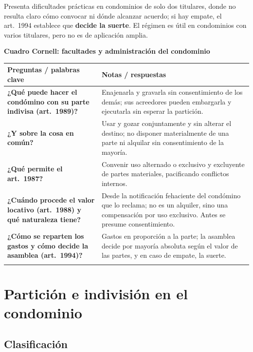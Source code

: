 \documentclass[12pt,oneside]{book}
\renewcommand{\arraystretch}{1.25}
\newcommand{\cq}[2]{\textbf{#1} & #2 \\[0.45em]}
\newcommand{\cornell}[3]{%
\par\bigskip\noindent\textbf{\large Cuadro Cornell: #1}\par\smallskip
\begin{center}
\small
\renewcommand{\arraystretch}{1.15}
\begin{tabularx}{\textwidth}{>{\raggedright\arraybackslash}p{0.27\textwidth}>{\raggedright\arraybackslash}X}
\toprule
\textbf{Preguntas / palabras clave} & \textbf{Notas / respuestas} \\
\midrule
#2
\midrule
\multicolumn{2}{p{\dimexpr\textwidth-2\tabcolsep\relax}}{\textbf{Resumen.} #3} \\
\bottomrule
\end{tabularx}
\end{center}
}
\begin{document}
Presenta dificultades prácticas en condominios de solo dos titulares, donde no resulta claro cómo convocar ni dónde alcanzar acuerdo; si hay empate, el art.~1994 establece que \textbf{decide la suerte}. El régimen es útil en condominios con varios titulares, pero no es de aplicación amplia.

\cornell{facultades y administración del condominio}{
\cq{¿Qué puede hacer el condómino con su parte indivisa (art.~1989)?}{Enajenarla y gravarla sin consentimiento de los demás; sus acreedores pueden embargarla y ejecutarla sin esperar la partición.}
\cq{¿Y sobre la cosa en común?}{Usar y gozar conjuntamente y sin alterar el destino; no disponer materialmente de una parte ni alquilar sin consentimiento de la mayoría.}
\cq{¿Qué permite el art.~1987?}{Convenir uso alternado o exclusivo y excluyente de partes materiales, pacificando conflictos internos.}
\cq{¿Cuándo procede el valor locativo (art.~1988) y qué naturaleza tiene?}{Desde la notificación fehaciente del condómino que lo reclama; no es un alquiler, sino una compensación por uso exclusivo. Antes se presume consentimiento.}
\cq{¿Cómo se reparten los gastos y cómo decide la asamblea (art.~1994)?}{Gastos en proporción a la parte; la asamblea decide por mayoría absoluta según el valor de las partes, y en caso de empate, la suerte.}
}{Las facultades del condómino son amplísimas sobre su parte indivisa y restringidas sobre la cosa común. El uso y goce puede pactarse; el uso exclusivo no pactado da lugar a valor locativo desde la notificación; los gastos se reparten según las partes y la asamblea decide por mayoría computada por valor.}

\chapter[Partición e indivisión en el condominio]{Partición e indivisión en el condominio}\label{cap:particion}

\section{Clasificación}
\end{document}
